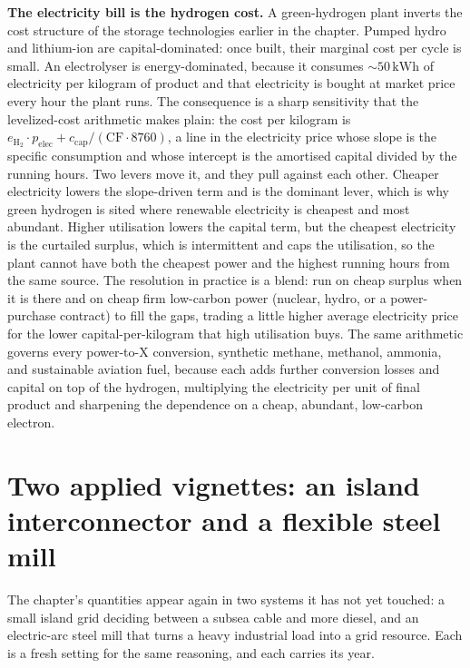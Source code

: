 \begin{mastery}
\textbf{The electricity bill is the hydrogen cost.} A green-hydrogen plant
inverts the cost structure of the storage technologies earlier in the
chapter. Pumped hydro and lithium-ion are capital-dominated: once built,
their marginal cost per cycle is small. An electrolyser is
energy-dominated, because it consumes $\sim 50\,\si{\kilo\watt\hour}$ of
electricity per kilogram of product and that electricity is bought at
market price every hour the plant runs. The consequence is a sharp
sensitivity that the levelized-cost arithmetic makes plain: the cost per
kilogram is $e_{\text{H}_2}\cdot p_{\text{elec}} + c_{\text{cap}}/(
\text{CF}\cdot 8760)$, a line in the electricity price whose slope is the
specific consumption and whose intercept is the amortised capital divided
by the running hours. Two levers move it, and they pull against each other.
Cheaper electricity lowers the slope-driven term and is the dominant lever,
which is why green hydrogen is sited where renewable electricity is cheapest
and most abundant. Higher utilisation lowers the capital term, but the
cheapest electricity is the curtailed surplus, which is intermittent and
caps the utilisation, so the plant cannot have both the cheapest power and
the highest running hours from the same source. The resolution in practice
is a blend: run on cheap surplus when it is there and on cheap firm
low-carbon power (nuclear, hydro, or a power-purchase contract) to fill the
gaps, trading a little higher average electricity price for the lower
capital-per-kilogram that high utilisation buys. The same arithmetic
governs every power-to-X conversion, synthetic methane, methanol, ammonia,
and sustainable aviation fuel, because each adds further conversion losses
and capital on top of the hydrogen, multiplying the electricity per unit of
final product and sharpening the dependence on a cheap, abundant,
low-carbon electron.
\end{mastery}

\section{Two applied vignettes: an island interconnector and a flexible steel mill}

The chapter's quantities appear again in two systems it has not yet touched: a
small island grid deciding between a subsea cable and more diesel, and an
electric-arc steel mill that turns a heavy industrial load into a grid
resource. Each is a fresh setting for the same reasoning, and each carries its
year.

